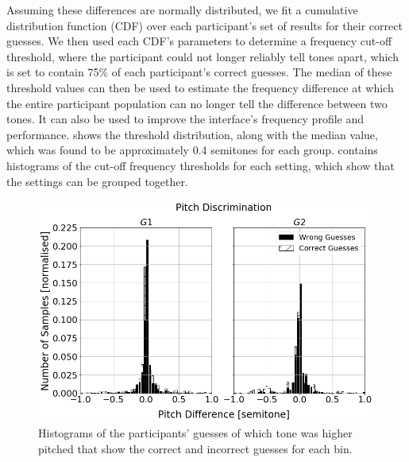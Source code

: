 \documentclass[acmsmall]{acmart}
\begin{document}
Assuming these differences are normally distributed, we fit a cumulative distribution function (CDF) over each participant's set of results for their correct guesses.
We then used each CDF's parameters to determine a frequency cut-off threshold, where the participant could not longer reliably tell tones apart, which is set to contain 75\% of each participant's correct guesses.
The median of these threshold values can then be used to estimate the frequency difference at which the entire participant population can no longer tell the difference between two tones. 
It can also be used to improve the interface's frequency profile and performance. 
 shows the threshold distribution, along with the median value, which was found to be approximately 0.4 semitones for each group. 
 contains histograms of the cut-off frequency thresholds for each setting, which show that the settings can be grouped together.

\begin{figure}
  \centering
  \includegraphics[width=0.8\columnwidth]{figures/pitch_discrimination.png}
  \caption{Histograms of the participants' guesses of which tone was higher pitched that show the correct and incorrect guesses for each bin. }\label{fig:pitch-discrimination}
\end{figure}
\end{document}

